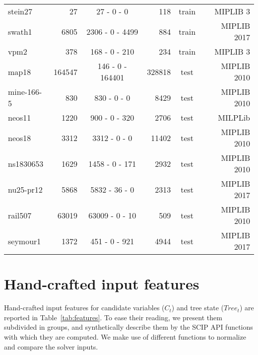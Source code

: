 \documentclass[letterpaper]{article} %
\begin{document}
\begin{table*}[t]
\begin{footnotesize}
\begin{tabular}{lrcrcr}
    stein27             & 27    & 27  - 0  - 0      & 118   & train & MIPLIB 3 \\
    swath1              & 6805  & 2306 - 0 - 4499   & 884   & train & MIPLIB 2017 \\
    vpm2                & 378   & 168 - 0 - 210     & 234   & train & MIPLIB 3 \\
\midrule
    map18               & 164547& 146 - 0 - 164401  & 328818& test & MIPLIB 2010 \\
    mine-166-5          & 830   & 830 - 0 - 0       & 8429  & test & MIPLIB 2010 \\
    neos11              & 1220  & 900 - 0 - 320     & 2706  & test & MILPLib\\
    neos18              & 3312  & 3312 - 0 - 0      & 11402 & test & MIPLIB 2010 \\
    ns1830653           & 1629  & 1458 - 0 - 171    & 2932  & test & MIPLIB 2010 \\
    nu25-pr12           & 5868  & 5832 - 36 - 0     & 2313  & test & MIPLIB 2017 \\
    rail507             & 63019 & 63009 - 0 - 10   & 509   & test & MIPLIB 2010 \\
    seymour1            & 1372  & 451 - 0 - 921     & 4944  & test & MIPLIB 2017\\
\bottomrule
\end{tabular}
\end{footnotesize}
\end{table*}


\section{Hand-crafted input features}
\label{app:features}

Hand-crafted input features for candidate variables ($C_t$) and tree state ($\mathit{Tree}_t$) are reported in Table~\ref{tab:features}. To ease their reading, we present them subdivided in groups, and synthetically describe them by the SCIP API functions with which they are computed. We make use of different functions to normalize and compare the solver inputs.
\end{document}
